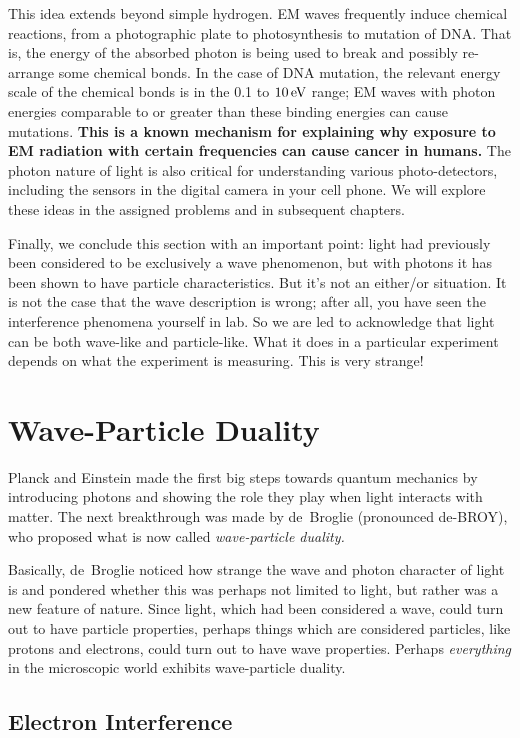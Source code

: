 This idea extends beyond simple hydrogen.  EM waves frequently induce
chemical reactions, from a photographic plate to photosynthesis to
mutation of DNA.  That is, the energy of the absorbed photon is being
used to break and possibly re-arrange some chemical bonds. In the case of DNA mutation, the
relevant energy scale of the chemical bonds is in the 0.1 to $10\,\mbox{eV}$
range; EM waves with photon energies comparable to or greater than 
these binding energies can cause mutations. {\bf This is a known mechanism
for explaining why exposure to EM radiation with certain frequencies can
cause cancer in humans.} The photon nature of light is also critical
for understanding various photo-detectors, including the sensors
in the digital camera in your cell phone. We will explore these ideas in the
assigned problems and in subsequent chapters.

Finally, we conclude this section with an important point: light had
previously been considered to be exclusively a wave phenomenon, but
with photons it has been shown to have particle characteristics.  But
it's not an either/or situation.  It is not the case that the wave
description is wrong; after all, you have seen the interference
phenomena yourself in lab.  So we are led to acknowledge that light
can be both wave-like and particle-like.  What it does in a particular
experiment depends on what the experiment is measuring.  This is very
strange! 

\section{Wave-Particle Duality}

Planck and Einstein made the first big steps towards quantum mechanics
by introducing photons and showing the role they play when light
interacts with matter.  The next breakthrough was made by de~Broglie
(pronounced de-BROY), who proposed what is now called {\it
  wave-particle duality.}

Basically, de~Broglie noticed how strange the wave and photon
character of light is and pondered whether this was perhaps not
limited to light, but rather was a new feature of nature.  Since
light, which had been considered a wave, could turn out to have
particle properties, perhaps things which are considered particles,
like protons and electrons, could turn out to have wave properties.
Perhaps {\it everything} in the microscopic world exhibits
wave-particle duality.

\subsection{Electron Interference}

